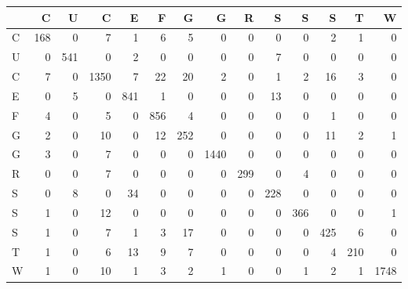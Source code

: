 \begin{tabular}{lrrrrrrrrrrrrr}
\toprule
{} &    C &    U &     C &    E &    F &    G &     G &    R &    S &    S &    S &    T &     W \\
\midrule
C &  168 &    0 &     7 &    1 &    6 &    5 &     0 &    0 &    0 &    0 &    2 &    1 &     0 \\
U &    0 &  541 &     0 &    2 &    0 &    0 &     0 &    0 &    7 &    0 &    0 &    0 &     0 \\
C &    7 &    0 &  1350 &    7 &   22 &   20 &     2 &    0 &    1 &    2 &   16 &    3 &     0 \\
E &    0 &    5 &     0 &  841 &    1 &    0 &     0 &    0 &   13 &    0 &    0 &    0 &     0 \\
F &    4 &    0 &     5 &    0 &  856 &    4 &     0 &    0 &    0 &    0 &    1 &    0 &     0 \\
G &    2 &    0 &    10 &    0 &   12 &  252 &     0 &    0 &    0 &    0 &   11 &    2 &     1 \\
G &    3 &    0 &     7 &    0 &    0 &    0 &  1440 &    0 &    0 &    0 &    0 &    0 &     0 \\
R &    0 &    0 &     7 &    0 &    0 &    0 &     0 &  299 &    0 &    4 &    0 &    0 &     0 \\
S &    0 &    8 &     0 &   34 &    0 &    0 &     0 &    0 &  228 &    0 &    0 &    0 &     0 \\
S &    1 &    0 &    12 &    0 &    0 &    0 &     0 &    0 &    0 &  366 &    0 &    0 &     1 \\
S &    1 &    0 &     7 &    1 &    3 &   17 &     0 &    0 &    0 &    0 &  425 &    6 &     0 \\
T &    1 &    0 &     6 &   13 &    9 &    7 &     0 &    0 &    0 &    0 &    4 &  210 &     0 \\
W &    1 &    0 &    10 &    1 &    3 &    2 &     1 &    0 &    0 &    1 &    2 &    1 &  1748 \\
\bottomrule
\end{tabular}
